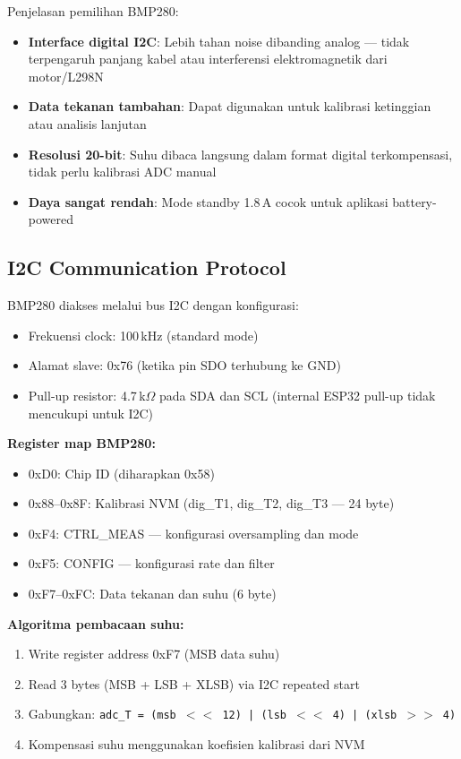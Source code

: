 \documentclass[11pt,a4paper]{article}
\begin{document}
Penjelasan pemilihan BMP280:
\begin{itemize}
    \item \textbf{Interface digital I2C}: Lebih tahan noise dibanding analog --- tidak terpengaruh panjang kabel atau interferensi elektromagnetik dari motor/L298N
    \item \textbf{Data tekanan tambahan}: Dapat digunakan untuk kalibrasi ketinggian atau analisis lanjutan
    \item \textbf{Resolusi 20-bit}: Suhu dibaca langsung dalam format digital terkompensasi, tidak perlu kalibrasi ADC manual
    \item \textbf{Daya sangat rendah}: Mode standby 1.8\,\textmu A cocok untuk aplikasi battery-powered
\end{itemize}

\subsection{I2C Communication Protocol}

BMP280 diakses melalui bus I2C dengan konfigurasi:
\begin{itemize}
    \item Frekuensi clock: 100\,kHz (standard mode)
    \item Alamat slave: 0x76 (ketika pin SDO terhubung ke GND)
    \item Pull-up resistor: 4.7\,k$\Omega$ pada SDA dan SCL (internal ESP32 pull-up tidak mencukupi untuk I2C)
\end{itemize}

\textbf{Register map BMP280:}
\begin{itemize}
    \item 0xD0: Chip ID (diharapkan 0x58)
    \item 0x88--0x8F: Kalibrasi NVM (dig\_T1, dig\_T2, dig\_T3 --- 24 byte)
    \item 0xF4: CTRL\_MEAS --- konfigurasi oversampling dan mode
    \item 0xF5: CONFIG --- konfigurasi rate dan filter
    \item 0xF7--0xFC: Data tekanan dan suhu (6 byte)
\end{itemize}

\textbf{Algoritma pembacaan suhu:}
\begin{enumerate}
    \item Write register address 0xF7 (MSB data suhu)
    \item Read 3 bytes (MSB + LSB + XLSB) via I2C repeated start
    \item Gabungkan: \texttt{adc\_T = (msb $<<$ 12) | (lsb $<<$ 4) | (xlsb $>>$ 4)}
    \item Kompensasi suhu menggunakan koefisien kalibrasi dari NVM
\end{enumerate}
\end{document}
